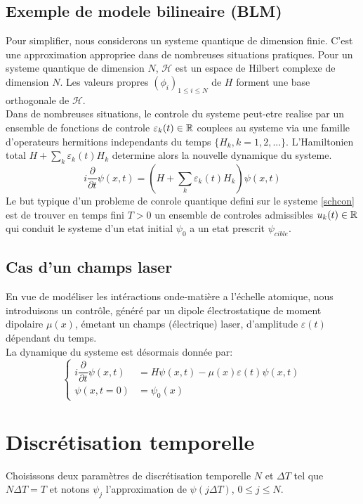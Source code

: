\subsection{Exemple de modele bilineaire (BLM)}
Pour simplifier, nous considerons un systeme quantique de dimension finie. C'est une approximation appropriee dans de nombreuses situations pratiques. Pour un systeme quantique de dimension $N$, $\mathcal{H}$ est un espace de Hilbert complexe de dimension $N$. Les valeurs propres $(\phi_{i})_{1 \leq i \leq N}$ de $H$ forment une base orthogonale de $\mathcal{H}$.\\
Dans de nombreuses situations, le controle du systeme peut-etre realise par un ensemble de fonctions de controle $\varepsilon_{k}(t) \in \mathbb R$ couplees au systeme via une famille d'operateurs hermitions independants du temps $\{H_k, k=1,2,...\}$. L'Hamiltonien total $H+\sum_{k} \varepsilon_{k}(t)H_k$ determine alors la nouvelle dynamique du systeme.
\begin{equation} \label{schcon}
i \dfrac{\partial }{\partial t} \psi (x,t) = (H+\sum_{k} \varepsilon_{k}(t)H_k)\psi (x,t)
\end{equation}
Le but typique d'un probleme de conrole quantique defini sur le systeme \eqref{schcon} est de trouver en temps fini $T > 0$ un ensemble de controles admissibles $u_k(t) \in \mathbb R$ qui conduit le systeme d'un etat initial $\psi_0$ a un etat prescrit $\psi_{cible}$.
\subsection{Cas d'un champs laser}
En vue de modéliser les intéractions onde-matière a l'échelle atomique, nous introduisons un contrôle, généré par un dipole électrostatique de moment dipolaire $\mu (x)$, émetant un champs (électrique) laser, d'amplitude $\varepsilon (t)$ dépendant du temps.\\
La dynamique du systeme est désormais donnée par:
\begin{equation}
\begin{cases}
i \dfrac{\partial }{\partial t} \psi (x,t) &= H\psi (x,t)-\mu(x)\varepsilon(t)\psi (x,t) \\
\psi (x,t=0) &= \psi_0(x)
\end{cases}
\end{equation}

\section{Discrétisation temporelle}
Choisissons deux paramètres de discrétisation temporelle $N$ et $\Delta T$ tel que $N \Delta T = T$ et notons $\psi_j$ l'approximation de $\psi(j\Delta T)$, $0 \leq j \leq N$.
